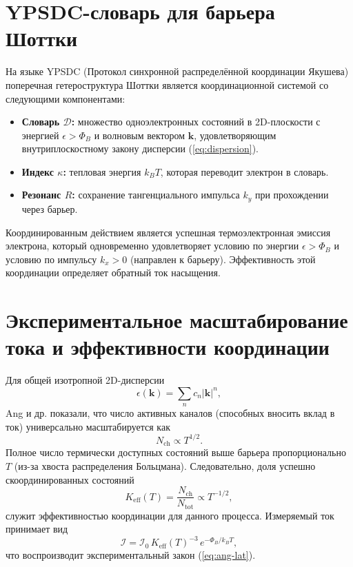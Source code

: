 \documentclass[12pt,a4paper]{article}
\newcommand{\Keff}{K_{\mathrm{eff}}}
\begin{document}
	\section{YPSDC-словарь для барьера Шоттки}
	На языке YPSDC (Протокол синхронной распределённой координации Якушева)
	поперечная гетероструктура Шоттки является координационной системой со
	следующими компонентами:
	\begin{itemize}
		\item \textbf{Словарь $\mathcal{D}$:} множество одноэлектронных
		состояний в 2D-плоскости с энергией $\epsilon > \Phi_B$ и
		волновым вектором $\mathbf{k}$, удовлетворяющим внутриплоскостному
		закону дисперсии (\ref{eq:dispersion}).
		\item \textbf{Индекс $\kappa$:} тепловая энергия $k_B T$, которая
		переводит электрон в словарь.
		\item \textbf{Резонанс $R$:} сохранение тангенциального импульса
		$k_y$ при прохождении через барьер.
	\end{itemize}
	Координированным действием является успешная термоэлектронная эмиссия
	электрона, который одновременно удовлетворяет условию по энергии
	$\epsilon > \Phi_B$ и условию по импульсу $k_x > 0$ (направлен к барьеру).
	Эффективность этой координации определяет обратный ток насыщения.
	
	\section{Экспериментальное масштабирование тока и эффективности координации}
	
	Для общей изотропной 2D-дисперсии
	\begin{equation}
		\epsilon(\mathbf{k}) = \sum_n c_n |\mathbf{k}|^n,
		\label{eq:dispersion}
	\end{equation}
	Ang и др. показали, что число активных каналов (способных вносить вклад в ток)
	универсально масштабируется как
	\begin{equation}
		N_{\mathrm{ch}} \propto T^{1/2}.
		\label{eq:Nch}
	\end{equation}
	Полное число термически доступных состояний выше барьера пропорционально
	$T$ (из-за хвоста распределения Больцмана). Следовательно, доля успешно
	скоординированных состояний
	\begin{equation}
		\Keff(T) = \frac{N_{\mathrm{ch}}}{N_{\mathrm{tot}}} \propto T^{-1/2},
		\label{eq:keff-T}
	\end{equation}
	служит эффективностью координации для данного процесса. Измеряемый ток
	принимает вид
	\begin{equation}
		\mathcal{I} = \mathcal{I}_0 \, \Keff(T)^{-3} \, e^{-\Phi_B/k_B T},
		\label{eq:I-via-keff}
	\end{equation}
	что воспроизводит экспериментальный закон (\ref{eq:ang-lat}).
	
\end{document}
